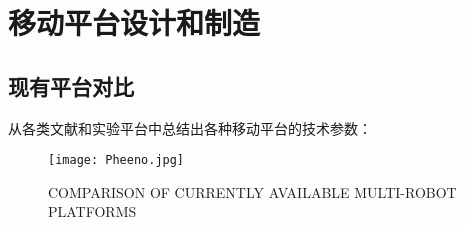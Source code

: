 \chapter{移动平台设计和制造}
\label{cha:Platform}

\section{现有平台对比}

从各类文献和实验平台中总结出各种移动平台的技术参数：


\begin{figure}[htbp]
    \centering
    \texttt{[image: Pheeno.jpg]}
    \caption{COMPARISON OF CURRENTLY AVAILABLE MULTI-ROBOT PLATFORMS\cite{wilson2016pheeno}}
    \label{fig:Pheeno}
\end{figure}

